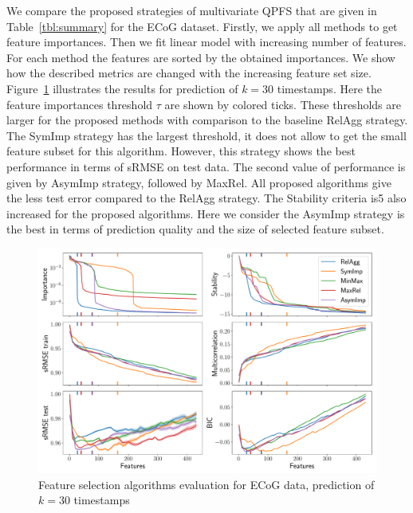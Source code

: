 \documentclass[12pt,oneside]{article}
\theoremstyle{definition}
\begin{document}
We compare the proposed strategies of multivariate QPFS that are given in Table~\ref{tbl:summary} for the ECoG dataset. 
Firstly, we apply all methods to get feature importances. 
Then we fit linear model with increasing number of features. 
For each method the features are sorted by the obtained importances. 
We show how the described metrics are changed with the increasing feature set size. 
Figure~\ref{fig:ecog_3_30_metrics} illustrates the results for prediction of $k = 30$ timestamps. 
Here the feature importances threshold $\tau$ are shown by colored ticks. 
These thresholds are larger for the proposed methods with comparison to the baseline RelAgg strategy. 
The SymImp strategy has the largest threshold, it does not allow to get the small feature subset for this algorithm.
However, this strategy shows the best performance in terms of sRMSE on test data.
The second value of performance is given by AsymImp strategy, followed by MaxRel.
All proposed algorithms give the less test error compared to the RelAgg strategy. 
The Stability criteria is5 also increased for the proposed algorithms.
Here we consider the AsymImp strategy is the best in terms of prediction quality and the size of selected feature subset.

\begin{figure}[h]
	\includegraphics[width=\linewidth]{figs/ecog_3_30_metrics.pdf}
	\caption{Feature selection algorithms evaluation for ECoG data, prediction of $k = 30$ timestamps}
	\label{fig:ecog_3_30_metrics}
\end{figure}
\end{document}
